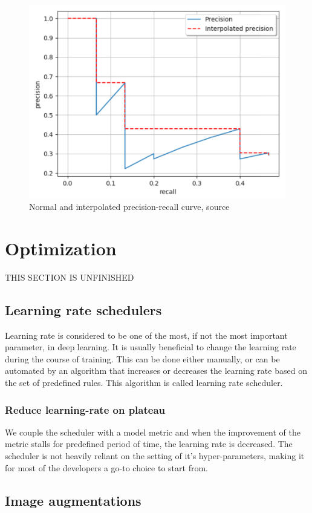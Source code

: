 \begin{figure}
    \includegraphics[width = \linewidth]{images/PR-curve.png}
    \caption{Normal and interpolated precision-recall curve, source \cite{Padilla2020}}
    \label{fig:pr_curve}
\end{figure}




\section{Optimization}
THIS SECTION IS UNFINISHED
\subsection{Learning rate schedulers}
Learning rate is considered to be one of the most, if not the most important parameter, in deep learning. It  is usually beneficial to change the learning rate during the course of training. This can be done either manually, or can be automated by an algorithm that increases or decreases the learning rate based on the set of predefined rules. This algorithm is called learning rate scheduler.

\subsubsection{Reduce learning-rate on plateau}
We couple the scheduler with a model metric and when the improvement of the metric stalls for predefined period of time, the learning rate is decreased.
The scheduler is not heavily reliant on the setting of it's hyper-parameters, making it for most of the developers a go-to choice to start from.

\subsection{Image augmentations}



